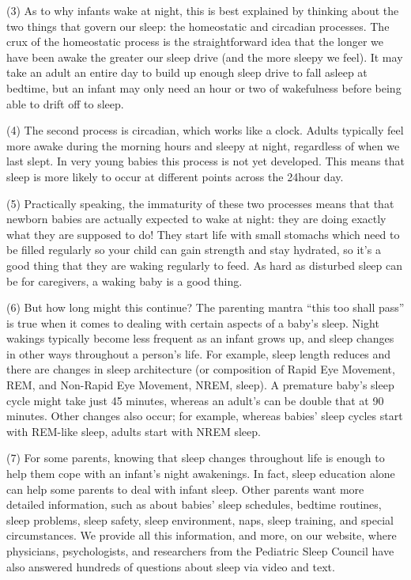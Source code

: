 \documentclass[UTF8,11pt]{ctexart}
\begin{document}
(3) As to why infants wake at night, this is best explained by thinking about the two things that govern our sleep: the homeostatic and circadian processes. The crux of the homeostatic process is the straightforward idea that the longer we have been awake the greater our sleep drive (and the more sleepy we feel). It may take an adult an entire day to build up enough sleep drive to fall asleep at bedtime, but an infant may only need an hour or two of wakefulness before being able to drift off to sleep.


(4) The second process is circadian, which works like a clock. Adults typically feel more awake during the morning hours and sleepy at night, regardless of when we last slept. In very young babies this process is not yet developed. This means that sleep is more likely to occur at different points across the 24hour day.


(5) Practically speaking, the immaturity of these two processes means that that newborn babies are actually expected to wake at night: they are doing exactly what they are supposed to do! They start life with small stomachs which need to be filled regularly so your child can gain strength and stay hydrated, so it’s a good thing that they are waking regularly to feed. As hard as disturbed sleep can be for caregivers, a waking baby is a good thing.


(6) But how long might this continue? The parenting mantra “this too shall pass” is true when it comes to dealing with certain aspects of a baby’s sleep. Night wakings typically become less frequent as an infant grows up, and sleep changes in other ways throughout a person’s life. For example, sleep length reduces and there are changes in sleep architecture (or composition of Rapid Eye Movement, REM, and Non-Rapid Eye Movement, NREM, sleep). A premature baby’s sleep cycle might take just 45 minutes, whereas an adult’s can be double that at 90 minutes. Other changes also occur; for example, whereas babies’ sleep cycles start with REM-like sleep, adults start with NREM sleep.


(7) For some parents, knowing that sleep changes throughout life is enough to help them cope with an infant’s night awakenings. In fact, sleep education alone can help some parents to deal with infant sleep. Other parents want more detailed information, such as about babies’ sleep schedules, bedtime routines, sleep problems, sleep safety, sleep environment, naps, sleep training, and special circumstances. We provide all this information, and more, on our website, where physicians, psychologists, and researchers from the Pediatric Sleep Council have also answered hundreds of questions about sleep via video and text.
\end{document}
